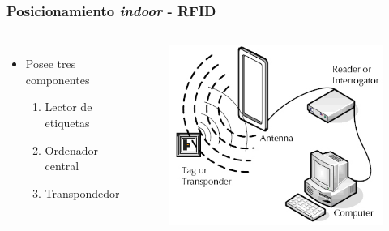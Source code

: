 \documentclass[mathserif]{beamer}
\begin{document}
\begin{frame}
\frametitle{Posicionamiento \textit{indoor} - RFID}

\begin{columns}[c]


\begin{itemize}

\item Posee tres componentes
\begin{enumerate}[1]
\item Lector de etiquetas
\item Ordenador central
\item Transpondedor
\end{enumerate}


\end{itemize}

 



\begin{figure}
\includegraphics[width=\textwidth]{../figures_chesta/estado_del_arte/how_rfid_works}
\end{figure}

\end{columns}


\end{frame}
\end{document}
